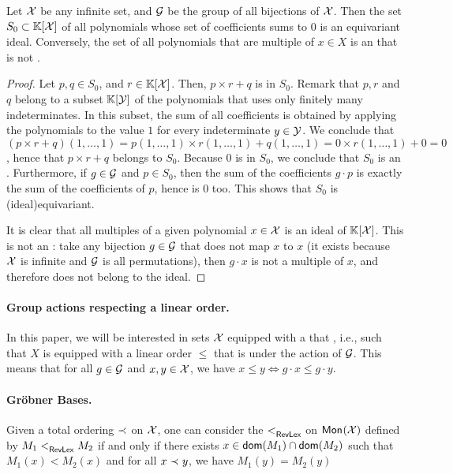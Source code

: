 \begin{example}
    \label{ex:idl-equiv}
    Let $\mathcal{X}$ be any infinite set, and $\mathcal{G}$ be the 
    group of all bijections of $\mathcal{X}$. 
    Then the set $S_0 \subset \mathbb{K}[\mathcal{X}]$ of all polynomials 
    whose set of coefficients sums to $0$ is an equivariant ideal.
    Conversely, the set of all polynomials that are multiple
    of $x \in X$ is an  that is not .
\end{example}
\begin{proof}
    Let $p,q\in S_0$, and $r \in \mathbb{K}[\mathcal{X}]$.
    Then, $p \times r + q$ is in $S_0$. Remark that 
    $p,r$ and $q$ belong to a subset $\mathbb{K}[\mathcal{Y}]$ of the 
    polynomials that uses only finitely many indeterminates.
    In this subset, the sum of all coefficients is obtained
    by applying the polynomials to the value $1$ for every indeterminate
    $y \in \mathcal{Y}$. We conclude that
    $(p \times r + q)(1,\dots, 1) 
    = p(1,\dots,1) \times r(1,\dots,1) + q(1,\dots,1)
    = 0 \times r(1, \dots, 1) + 0 = 0$, hence that
    $p \times r + q$ belongs to $S_0$. 
    Because $0$ is in $S_0$, we conclude that $S_0$ is an .
    Furthermore, if $g \in \mathcal{G}$ and $p \in S_0$, then
    the sum of the coefficients $g \cdot p$ is exactly
    the sum of the coefficients of $p$, hence is $0$ too.
    This shows that $S_0$ is \kl(ideal){equivariant}.

    It is clear that all multiples of a given polynomial $x \in \mathcal{X}$
    is an ideal of $\mathbb{K}[\mathcal{X}]$. This is not an :
    take any bijection $g \in \mathcal{G}$ that does not map $x$ to $x$ (it
    exists because $\mathcal{X}$ is infinite and $\mathcal{G}$ is all permutations),
    then $g \cdot x$ is not a multiple of $x$, and therefore does 
    not belong to the ideal.
\end{proof}


\paragraph{Group actions respecting a linear order.} In this paper, we will be
interested in sets $\mathcal{X}$ equipped with a  that , i.e., such that $X$ is equipped with a linear order $\leq$
that is  under the action of $\mathcal{G}$. This means that for all $g
\in \mathcal{G}$ and $x,y \in \mathcal{X}$, we have $x \leq y \iff g \cdot x \leq g \cdot y$.



\paragraph{Gröbner Bases.} \AP Given a total ordering $\prec_{}$ on $\mathcal{X}$, one can
consider the  $<_{\mathsf{RevLex}}^{}$ on $\mathsf{Mon}_{}(\mathcal{X})$ defined by $M_1
<_{\mathsf{RevLex}}^{} M_2$ if and only if there exists $x \in \mathsf{dom}(M_1) \cap \mathsf{dom}(M_2)$ such
that $M_1(x) < M_2(x)$ and for all $x \prec_{} y$, we have $M_1(y) = M_2(y)$

